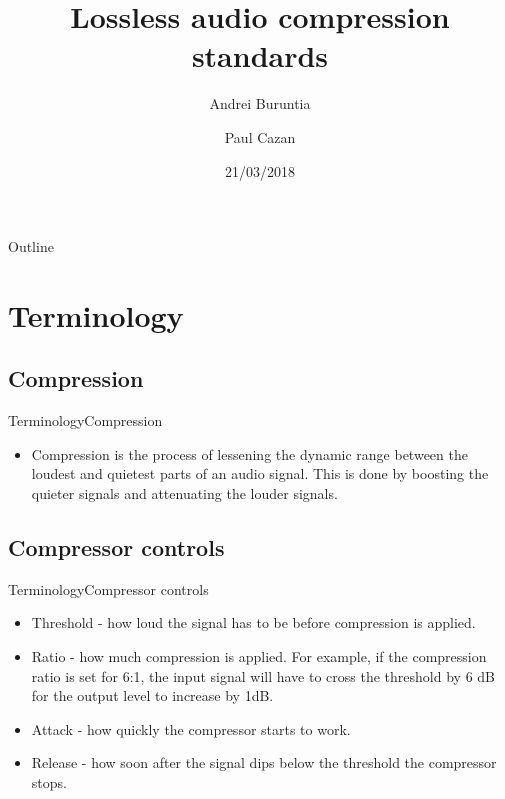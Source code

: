 \documentclass{beamer}
\title{Lossless audio compression standards}
\author{Andrei Buruntia \and Paul Cazan}
\date{21/03/2018}
\begin{document}
\begin{frame}
  \titlepage
\end{frame}

\begin{frame}{Outline}
  \tableofcontents
\end{frame}

\section{Terminology}
\subsection{Compression}
\begin{frame}{Terminology}{Compression}
	\begin{itemize}
	\item{
		Compression is the process of lessening the dynamic range between the loudest and quietest parts of an audio signal. This is done by boosting the quieter signals and attenuating the louder signals.
		}
	\end{itemize}
\end{frame}


\subsection{Compressor controls}
\begin{frame}{Terminology}{Compressor controls}
	\begin{itemize}
		\item{
				Threshold - how loud the signal has to be before compression is applied.
			}
			\item{
				Ratio - how much compression is applied. For example, if the compression ratio is set for 6:1, the input signal will have to cross the threshold by 6 dB for the output level to increase by 1dB.
			}
			\item{
				Attack - how quickly the compressor starts to work.
			}
			\item{
				Release - how soon after the signal dips below the threshold the compressor stops.
			}
	\end{itemize}
\end{frame}
\end{document}
